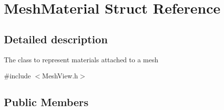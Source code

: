 \hypertarget{struct_mesh_material}{}\section{Mesh\+Material Struct Reference}
\label{struct_mesh_material}


\subsection{Detailed description}
The class to represent materials attached to a mesh 

{\ttfamily \#include $<$Mesh\+View.\+h$>$}

\subsection*{Public Members}
